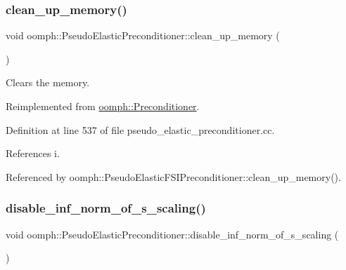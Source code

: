 \subsubsection{\texorpdfstring{clean\+\_\+up\+\_\+memory()}{clean\_up\_memory()}}
{\footnotesize\ttfamily void oomph\+::\+Pseudo\+Elastic\+Preconditioner\+::clean\+\_\+up\+\_\+memory (\begin{DoxyParamCaption}{ }\end{DoxyParamCaption})\hspace{0.3cm}{\ttfamily [virtual]}}



Clears the memory. 



Reimplemented from \hyperlink{classoomph_1_1Preconditioner_a46c31c416829bedcd9db238431262027}{oomph\+::\+Preconditioner}.



Definition at line 537 of file pseudo\+\_\+elastic\+\_\+preconditioner.\+cc.



References i.



Referenced by oomph\+::\+Pseudo\+Elastic\+F\+S\+I\+Preconditioner\+::clean\+\_\+up\+\_\+memory().

\mbox{\label{classoomph_1_1PseudoElasticPreconditioner_a038e7d2eaea4346c3ea6ba2b34ae824c}} 
\subsubsection{\texorpdfstring{disable\+\_\+inf\+\_\+norm\+\_\+of\+\_\+s\+\_\+scaling()}{disable\_inf\_norm\_of\_s\_scaling()}}
{\footnotesize\ttfamily void oomph\+::\+Pseudo\+Elastic\+Preconditioner\+::disable\+\_\+inf\+\_\+norm\+\_\+of\+\_\+s\+\_\+scaling (\begin{DoxyParamCaption}{ }\end{DoxyParamCaption})\hspace{0.3cm}{\ttfamily [inline]}}



